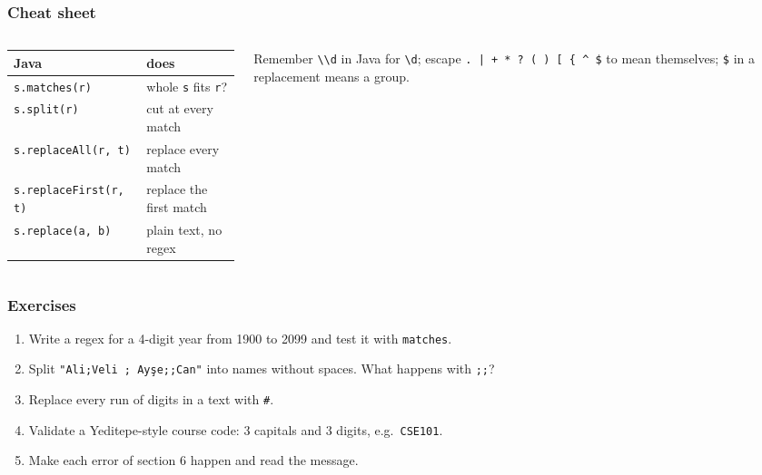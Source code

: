 \documentclass[aspectratio=169,10pt,compress]{beamer}
\begin{document}
\begin{frame}[t,fragile] \frametitle{Cheat sheet}
  \begin{columns}[T]
    \begin{column}{0.5\textwidth}
      \begin{center}\footnotesize
      \begin{tabular}{@{}ll@{}}
        \toprule
        \textbf{Java}                          & \textbf{does} \\
        \midrule
        \texttt{s.matches(r)}                  & whole \texttt{s} fits \texttt{r}? \\
        \texttt{s.split(r)}                    & cut at every match \\
        \texttt{s.replaceAll(r, t)}            & replace every match \\
        \texttt{s.replaceFirst(r, t)}          & replace the first match \\
        \texttt{s.replace(a, b)}               & plain text, no regex \\
        \bottomrule
      \end{tabular}
      \end{center}
    \end{column}
    \begin{column}{0.46\textwidth}
      \begin{block}{Remember}
        \small \texttt{\textbackslash\textbackslash d} in Java for \texttt{\textbackslash d};
        escape \texttt{. | + * ? ( ) [ \{ \textasciicircum{} \$} to mean themselves;
        \texttt{\$} in a replacement means a group.
      \end{block}
    \end{column}
  \end{columns}
\end{frame}




\begin{frame}[t,fragile] \frametitle{Exercises}
  \begin{enumerate}\small
    \item Write a regex for a 4-digit year from 1900 to 2099 and test it with \texttt{matches}.
    \item Split \texttt{"Ali;Veli ; Ayşe;;Can"} into names without spaces. What happens with \texttt{;;}?
    \item Replace every run of digits in a text with \texttt{\#}.
    \item Validate a Yeditepe-style course code: 3 capitals and 3 digits, e.g.\ \texttt{CSE101}.
    \item Make each error of section 6 happen and read the message.
  \end{enumerate}
\end{frame}




\begin{frame}[t,fragile]
	\begin{center}
		\vspace{4cm}
	\end{center}
\end{frame}
\end{document}
